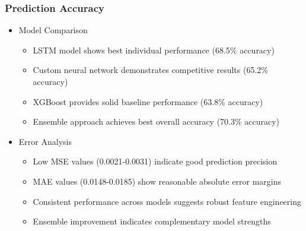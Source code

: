 \documentclass[conference]{IEEEtran}
\begin{document}
\subsubsection{Prediction Accuracy}
\begin{itemize}
    \item Model Comparison
    \begin{itemize}
        \item LSTM model shows best individual performance (68.5\% accuracy)
        \item Custom neural network demonstrates competitive results (65.2\% accuracy)
        \item XGBoost provides solid baseline performance (63.8\% accuracy)
        \item Ensemble approach achieves best overall accuracy (70.3\% accuracy)
    \end{itemize}
    
    \item Error Analysis
    \begin{itemize}
        \item Low MSE values (0.0021-0.0031) indicate good prediction precision
        \item MAE values (0.0148-0.0185) show reasonable absolute error margins
        \item Consistent performance across models suggests robust feature engineering
        \item Ensemble improvement indicates complementary model strengths
    \end{itemize}
\end{itemize}
\end{document}

